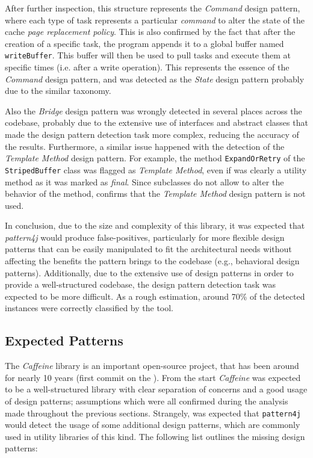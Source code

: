 After further inspection, this structure represents the \textit{Command} design pattern, where each type of task represents a particular \textit{command} to alter the state of the cache \textit{page replacement policy}. This is also confirmed by the fact that after the creation of a specific task, the program appends it to a global buffer named \texttt{writeBuffer}. This buffer will then be used to pull tasks and execute them at specific times (i.e. after a write operation). This represents the essence of the \textit{Command} design pattern, and was detected as the \textit{State} design pattern probably due to the similar taxonomy.

Also the \textit{Bridge} design pattern was wrongly detected in several places across the codebase, probably due to the extensive use of interfaces and abstract classes that made the design pattern detection task more complex, reducing the accuracy of the results. Furthermore, a similar issue happened with the detection of the \textit{Template Method} design pattern. For example, the method \texttt{ExpandOrRetry} of the \texttt{StripedBuffer} class was flagged as \textit{Template Method}, even if was clearly a utility method as it was marked as \textit{final}. Since subclasses do not allow to alter the behavior of the method, confirms that the \textit{Template Method} design pattern is not used.

In conclusion, due to the size and complexity of this library, it was expected that \textit{pattern4j} would produce false-positives, particularly for more flexible design patterns that can be easily manipulated to fit the architectural needs without affecting the benefits the pattern brings to the codebase (e.g., behavioral design patterns). Additionally, due to the extensive use of design patterns in order to provide a well-structured codebase, the design pattern detection task was expected to be more difficult. As a rough estimation, around 70\% of the detected instances were correctly classified by the tool.

\subsection{Expected Patterns}

The \textit{Caffeine} library is an important open-source project, that has been around for nearly 10 years (first commit on the ). From the start \textit{Caffeine} was expected to be a well-structured library with clear separation of concerns and a good usage of design patterns; assumptions which were all confirmed during the analysis made throughout the previous sections. Strangely, was expected that \texttt{pattern4j} would detect the usage of some additional design patterns, which are commonly used in utility libraries of this kind. The following list outlines the missing design patterns:

